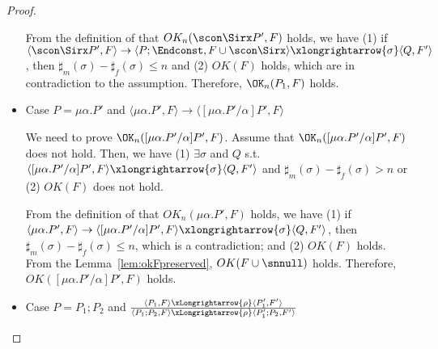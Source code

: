 \begin{proof}
\begin{itemize}
  From the definition of that \(OK_n(\scon\Sirx P', F)\) holds, we
  have (1) if \( \langle \scon\Sirx P', F \rangle \rightarrow \langle
  P;\Endconst, F\cup{\scon\Sirx} \rangle \xlongrightarrow{\sigma}
  \langle Q, F' \rangle \), then \(\sharp_m(\sigma) -
  \sharp_f(\sigma) \le n \) and (2) \(OK(F)\) holds, which are in
  contradiction to the assumption.  Therefore, \(\OK_n(P_1, F)\)
  holds.

\item Case \( P = \mu\alpha.P' \) and \(  \langle \mu\alpha.P', F \rangle
  \rightarrow \langle [\mu\alpha.P'/\alpha]P', F  \rangle  \)

  We need to prove \(\OK_n([\mu\alpha.P'/\alpha]P', F) \).  Assume
  that \(\OK_n( [\mu\alpha.P'/\alpha]P', F) \) does not hold. Then, we
  have (1) \( \exists \sigma \) and \(Q\) s.t. \( \langle
  [\mu\alpha.P'/\alpha]P', F \rangle \xlongrightarrow{\sigma} \langle
  Q, F' \rangle \) and \(\sharp_{m}(\sigma) -
  \sharp_{f}(\sigma) > n\) or (2) \( OK(F)\) does not hold.

  From the definition of that \(OK_n(\mu\alpha.P', F)\) holds, we have
  (1) if \( \langle \mu\alpha.P', F \rangle \rightarrow \langle
  [\mu\alpha.P'/\alpha]P', F \rangle \xlongrightarrow{\sigma} \langle
  Q, F' \rangle \), then \(\sharp_m(\sigma) -
  \sharp_f(\sigma) \le n \), which is a contradiction; and (2)
  \(OK(F)\) holds. From the Lemma~\ref{lem:okFpreserved},
  \(OK(F\cup{\snnull})\) holds. Therefore,
  \(OK([\mu\alpha.P'/\alpha]P', F) \) holds.




\item Case \( P = P_1;P_2 \) and \( \frac{ \langle P_1, F \rangle
  \xLongrightarrow{\rho} \langle P_1', F' \rangle} { \langle P_1;P_2,
  F \rangle \xLongrightarrow{\rho} \langle P_1';P_2, F' \rangle } \)


\end{itemize}
\end{proof}
